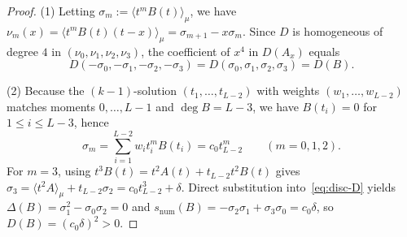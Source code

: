 \documentclass[11pt,a4paper]{article}
\theoremstyle{definition}
\theoremstyle{remark}
\begin{document}
\begin{proof}
(1) Letting $\sigma_m := \langle t^m B(t) \rangle_\mu$, we have $\nu_m(x) = \langle t^m B(t)(t - x) \rangle_\mu = \sigma_{m+1} - x \sigma_m$. Since $D$ is homogeneous of degree $4$ in $(\nu_0, \nu_1, \nu_2, \nu_3)$, the coefficient of $x^4$ in $D(A_x)$ equals
\[
D(-\sigma_0, -\sigma_1, -\sigma_2, -\sigma_3) = D(\sigma_0, \sigma_1, \sigma_2, \sigma_3) = D(B).
\]

(2) Because the $(k-1)$-solution $(t_1, \dots, t_{L-2})$ with weights $(w_1, \dots, w_{L-2})$ matches moments $0, \dots, L - 1$ and $\deg B = L - 3$, we have $B(t_i) = 0$ for $1 \le i \le L - 3$, hence
\[
\sigma_m = \sum_{i=1}^{L-2} w_i t_i^m B(t_i) = c_0 t_{L-2}^m \qquad (m = 0, 1, 2).
\]
For $m = 3$, using $t^3 B(t) = t^2 A(t) + t_{L-2} t^2 B(t)$ gives $\sigma_3 = \langle t^2 A \rangle_\mu + t_{L-2} \sigma_2 = c_0 t_{L-2}^3 + \delta$. Direct substitution into~\eqref{eq:disc-D} yields $\Delta(B) = \sigma_1^2 - \sigma_0 \sigma_2 = 0$ and $s_{\mathrm{num}}(B) = -\sigma_2 \sigma_1 + \sigma_3 \sigma_0 = c_0 \delta$, so $D(B) = (c_0 \delta)^2 > 0$.
\end{proof}
\end{document}
